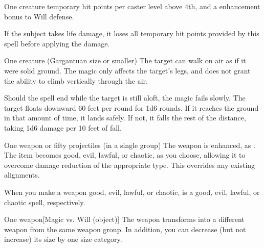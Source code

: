 \spellrng{\rngclose}
\spelldur{\durshort}
\begin{spelltarget}{One creature}
     temporary hit points  per caster level above 4th, and a  enhancement bonus to Will defense. \spellbonusscalingdescription
\end{spelltarget}
\spellnotes If the subject takes life damage, it loses all temporary hit points provided by this spell before applying the damage.

\spellrng{\rngtouch}
\spelldur{\durshort}
\begin{spelltarget}{One creature (Gargantuan size or smaller)}
    \spelleffect The target can walk on air as if it were solid ground. The magic only affects the target's legs, and does not grant the ability to climb vertically through the air.
    \par Should the spell end while the target is still aloft, the magic fails slowly. The target floats downward 60 feet per round for 1d6 rounds. If it reaches the ground in that amount of time, it lands safely. If not, it falls the rest of the distance, taking 1d6 damage per 10 feet of fall.
\end{spelltarget}

\spellrng{\rngclose}
\begin{spelltarget}{One weapon or fifty projectiles (in a single group)}
    \spelleffect The weapon is enhanced, as .
    \spellsuccess The item becomes good, evil, lawful, or chaotic, as you choose, allowing it to overcome damage reduction of the appropriate type. This overrides any existing alignments.
\end{spelltarget}
\spellnotes When you make a weapon good, evil, lawful, or chaotic,  is a good, evil, lawful, or chaotic spell, respectively.

\spelldur{\durmed}
\begin{spelltarget}{One weapon}[Magic vs. Will (object)]
    \spellsuccess The weapon transforms into a different weapon from the same weapon group. In addition, you can decrease (but not increase) its size by one size category.
\end{spelltarget}

